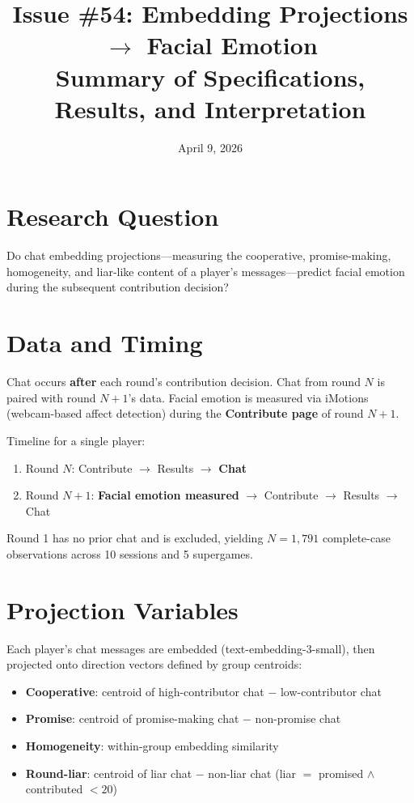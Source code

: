 \documentclass[11pt]{article}
\title{Issue \#54: Embedding Projections $\rightarrow$ Facial Emotion\\[6pt]
\large Summary of Specifications, Results, and Interpretation}
\author{}
\date{April 9, 2026}
\begin{document}
\maketitle

\section{Research Question}

Do chat embedding projections---measuring the cooperative, promise-making, homogeneity, and liar-like content of a player's messages---predict facial emotion during the subsequent contribution decision?

\section{Data and Timing}

Chat occurs \textbf{after} each round's contribution decision. Chat from round $N$ is paired with round $N+1$'s data. Facial emotion is measured via iMotions (webcam-based affect detection) during the \textbf{Contribute page} of round $N+1$.

\medskip
\noindent Timeline for a single player:
\begin{enumerate}[nosep]
    \item Round $N$: Contribute $\rightarrow$ Results $\rightarrow$ \textbf{Chat}
    \item Round $N+1$: \textbf{Facial emotion measured} $\rightarrow$ Contribute $\rightarrow$ Results $\rightarrow$ Chat
\end{enumerate}

Round 1 has no prior chat and is excluded, yielding $N = 1{,}791$ complete-case observations across 10 sessions and 5 supergames.

\section{Projection Variables}

Each player's chat messages are embedded (text-embedding-3-small), then projected onto direction vectors defined by group centroids:

\begin{itemize}[nosep]
    \item \textbf{Cooperative}: centroid of high-contributor chat $-$ low-contributor chat
    \item \textbf{Promise}: centroid of promise-making chat $-$ non-promise chat
    \item \textbf{Homogeneity}: within-group embedding similarity
    \item \textbf{Round-liar}: centroid of liar chat $-$ non-liar chat (liar $=$ promised $\wedge$ contributed $< 20$)
\end{itemize}
\end{document}
